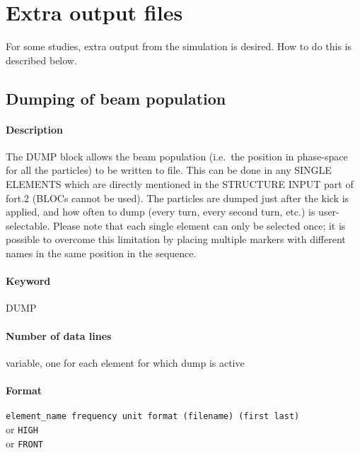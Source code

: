 \documentclass[a4paper,11pt]{report}
\begin{document}
\section{Extra output files}
For some studies, extra output from the simulation is desired.
How to do this is described below.

\subsection{Dumping of beam population} \label{sec:DUMP}

\paragraph{Description}
The DUMP block allows the beam population (i.e.\ the position in phase-space for all the particles) to be written to file.
This can be done in any SINGLE ELEMENTS which are directly mentioned in the STRUCTURE INPUT part of fort.2 (BLOCs cannot be used).
The particles are dumped just after the kick is applied, and how often to dump (every turn, every second turn, etc.) is user-selectable.
Please note that each single element can only be selected once; it is possible to overcome this limitation by placing multiple markers with different names in the same position in the sequence.

\paragraph{Keyword}
DUMP

\paragraph{Number of data lines}
variable, one for each element for which dump is active

\paragraph{Format}
\texttt{element\_name frequency unit format (filename) (first last)}\\
or \texttt{HIGH}\\
or \texttt{FRONT}
\end{document}
